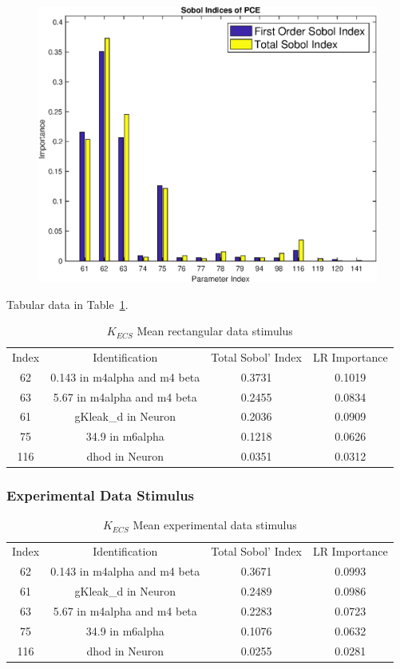 \documentclass[12pt]{article}
\numberwithin{equation}{section}
\begin{document}
\begin{figure}[h]
\includegraphics[width=.49 \textwidth]{Figures/K_ECS_Mean_QoI_PCE_SI_Rectangular.eps}
\end{figure}

Tabular data in Table~\ref{K_ECS_Mean_rec}.

\begin{table}[h]
\centering
\begin{tabular}{cccc}
Index & Identification & Total Sobol' Index & LR Importance \\
62 & 0.143 in m4alpha and m4 beta &  0.3731 & 0.1019\\
63 & 5.67 in m4alpha and m4 beta & 0.2455 & 0.0834\\
61 & gKleak\_d in Neuron & 0.2036 & 0.0909\\
75 & 34.9 in m6alpha & 0.1218 & 0.0626\\
116 & dhod in Neuron &  0.0351 & 0.0312\\
\end{tabular}
\caption{$K_{ECS}$ Mean rectangular data stimulus}
\label{K_ECS_Mean_rec}
\end{table}

\newpage

\subsubsection{Experimental Data Stimulus}

\begin{table}[h]
\centering
\begin{tabular}{cccc}
Index & Identification & Total Sobol' Index & LR Importance \\
62 & 0.143 in m4alpha and m4 beta & 0.3671 & 0.0993\\
61 & gKleak\_d in Neuron &  0.2489 & 0.0986\\
63 & 5.67 in m4alpha and m4 beta & 0.2283 &  0.0723\\
75 & 34.9 in m6alpha & 0.1076 & 0.0632\\
116 & dhod in Neuron &  0.0255 & 0.0281\\
\end{tabular}
\caption{$K_{ECS}$ Mean experimental data stimulus}
\label{K_ECS_Mean_ex}
\end{table}
\end{document}
